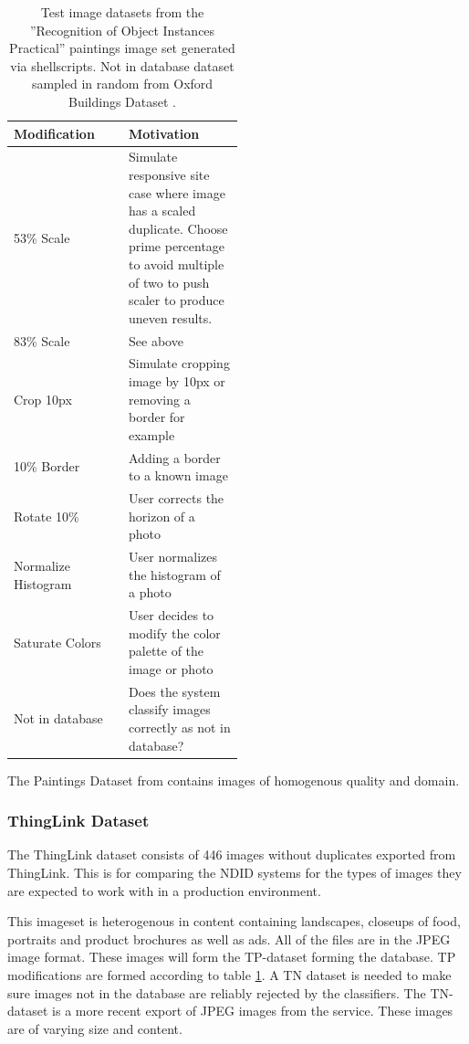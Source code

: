 \documentclass[english,12pt,a4paper,pdftex,elec,utf8, table]{aaltothesis}
\begin{document}
\def\arraystretch{1.5}
\begin{table}[htb]
\caption{Test image datasets from the ''Recognition of Object Instances Practical'' \cite{Vedaldi2012} paintings image set generated via shellscripts. Not in database dataset sampled in random from Oxford Buildings Dataset \cite{PhilbinJamesArandjelovicReljaZisserman2012}.}
\label{modifiedimages}
\begin{center}
\begin{tabular}{lp{0.5\linewidth}}
  Modification & Motivation \\
  \hline \hline
  53\% Scale& Simulate responsive site case where image has a scaled duplicate. Choose prime percentage to avoid multiple of two to push scaler to produce uneven results.\\
  \hline
  83\% Scale& See above \\
  \hline
  Crop 10px & Simulate cropping image by 10px or removing a border for example\\
  \hline
  10\% Border & Adding a border to a known image \\
  \hline
  Rotate 10\% & User corrects the horizon of a photo \\
  \hline
  Normalize Histogram & User normalizes the histogram of a photo\\
  \hline
  Saturate Colors & User decides to modify the color palette of the image or photo\\
  \hline
  Not in database & Does the system classify images correctly as not in database?\\
\end{tabular}
\end{center}\end{table}

The Paintings Dataset from \cite{Vedaldi2012} contains images of homogenous quality and domain.

\subsubsection{ThingLink Dataset}
The ThingLink dataset consists of 446 images without duplicates exported from ThingLink. This is for comparing the NDID systems for the types of images they are expected to work with in a production environment.

This imageset is heterogenous in content containing landscapes, closeups of food, portraits and product brochures as well as ads. All of the files are in the JPEG image format. These images will form the TP-dataset forming the database. TP modifications are formed according to table \ref{modifiedimages}. A TN dataset is needed to make sure images not in the database are reliably rejected by the classifiers. The TN-dataset is a more recent export of JPEG images from the service. These images are of varying size and content.
\end{document}
